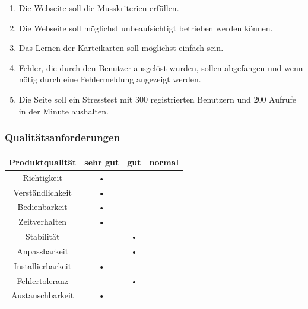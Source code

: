 \begin{enumerate}[leftmargin=2cm, label=\bfseries /NF\arabic*0/]
	 \item Die Webseite soll die Musskriterien erfüllen.
     \item Die Webseite soll möglichst unbeaufsichtigt betrieben werden können.
     \item Das Lernen der Karteikarten soll möglichst einfach sein.
     \item Fehler, die durch den Benutzer ausgelöst wurden, sollen abgefangen und wenn nötig durch eine Fehlermeldung angezeigt werden.
     \item Die Seite soll ein Stresstest mit 300 registrierten Benutzern und 200 Aufrufe in der Minute aushalten.
\end{enumerate}

\subsubsection{Qualitätsanforderungen}
\begin{center}
\begin{tabular}{|c|c|c|c|}
\hline 
\textbf{Produktqualität} & \textbf{sehr gut} & \textbf{gut} & \textbf{normal} \\ 
\hline 
Richtigkeit & • && \\ 
\hline 
Verständlichkeit & • & & \\ 
\hline 
Bedienbarkeit & • & & \\ 
\hline 
Zeitverhalten & • & & \\ 
\hline 
Stabilität & & • & \\ 
\hline 
Anpassbarkeit & & • & \\ 
\hline 
Installierbarkeit & • & & \\ 
\hline 
Fehlertoleranz & & • & \\ 
\hline 
Austauschbarkeit & • & & \\ 
\hline 
\end{tabular}
\end{center}



